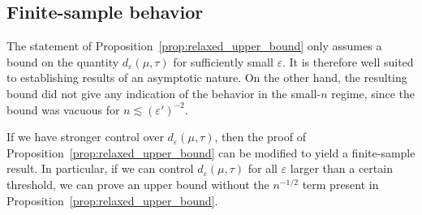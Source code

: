\documentclass[sts]{imsart}
\newcommand*{\ep}{\varepsilon}
\begin{document}
\subsection{Finite-sample behavior}
The statement of Proposition~\ref{prop:relaxed_upper_bound} only assumes a bound on the quantity $d_\ep(\mu, \tau)$ for sufficiently small $\ep$.
It is therefore well suited to establishing results of an asymptotic nature.
On the other hand, the resulting bound did not give any indication of the behavior in the small-$n$ regime, since the bound was vacuous for $n \lesssim (\ep')^{-2}$.

If we have stronger control over $d_\ep(\mu, \tau)$, then the proof of Proposition~\ref{prop:relaxed_upper_bound} can be modified to yield a finite-sample result.
In particular, if we can control $d_{\ep}(\mu, \tau)$ for all $\ep$ larger than a certain threshold, we can prove an upper bound without the $n^{-1/2}$ term present in Proposition~\ref{prop:relaxed_upper_bound}.
\end{document}
